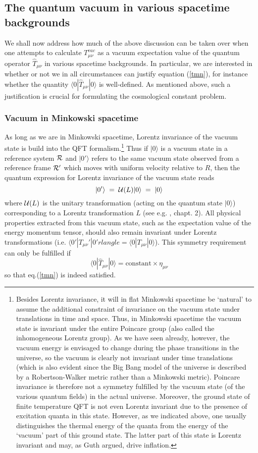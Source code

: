 \documentclass[12pt]{article}
\def\ss{\subsection}
\def\sss{\subsubsection}
\begin{document}
\ss{The quantum vacuum in various spacetime backgrounds}

We shall now address how much of the above discussion can be taken
over when one attempts to calculate $T^{vac}_{\mu\nu}$ as a vacuum
expectation value of the quantum operator $\hat{T}_{\mu \nu}$ in
various spacetime backgrounds. In particular, we are interested in
whether or not we in all circumstances can justify equation
(\ref{tmn}), for instance whether the quantity $\langle 0|\hat{T}_{\mu\nu}|0 \rangle $ is
well-defined. As mentioned above, such a justification is crucial
for formulating the cosmological constant problem.

\sss{Vacuum in Minkowski spacetime}

As long as we are in Minkowski spacetime, Lorentz invariance of
the vacuum state is build into the QFT formalism.\footnote{Besides
Lorentz invariance, it will in flat Minkowski spacetime be
`natural' to assume the additional constraint of invariance on the
vacuum state under translations in time and space. Thus, in
Minkowski spacetime the vacuum state is invariant under the entire
Poincare group (also called the inhomogeneous Lorentz group). As
we have seen already, however, the vacuum energy is envisaged to
change during the phase transitions in the universe, so the vacuum
is clearly not invariant under time translations (which is also
evident since the Big Bang model of the universe is described by a
Robertson-Walker metric rather than a Minkowski metric). Poincare
invariance is therefore not a symmetry fulfilled by the vacuum
state (of the various quantum fields) in the actual universe.
Moreover, the ground state of finite temperature QFT is not even
Lorentz invariant due to the presence of excitation quanta in this
state. However, as we indicated above, one usually distinguishes
the thermal energy of the quanta from the energy of the `vacuum'
part of this ground state. The latter part of this state is
Lorentz invariant and may, as Guth argued, drive inflation.} Thus
if $|0 \rangle $ is a vacuum state in a reference system $\cal{R}$ and
$|0'\rangle$ refers to the same vacuum state observed from a reference
frame $\cal{R'}$ which moves with uniform velocity relative to
$R$, then the quantum expression for Lorentz invariance of the
vacuum state reads
$$|0'\rangle\; =\; {\cal{U}}(L)|0 \rangle \;=\;|0 \rangle $$
where ${\cal{U}}(L)$ is the unitary transformation (acting on
the quantum state $|0 \rangle $) corresponding to a Lorentz transformation $L$
(see e.g. \cite{weinberg96}, chapt. 2).
All physical properties extracted from this vacuum state, such as the 
expectation value of the energy momentum tensor,
should also remain invariant under Lorentz transformations 
(i.e. $\langle 0'|T_{\mu\nu}'|0'rlangle = \langle 0|T_{\mu\nu}|0 \rangle $). This symmetry
requirement can only be fulfilled if
$$\langle 0|\hat{T}_{\mu \nu}|0 \rangle = \mbox{constant} \times \eta_{\mu\nu}$$
so that eq.(\ref{tmn}) is indeed satisfied.  
\end{document}
